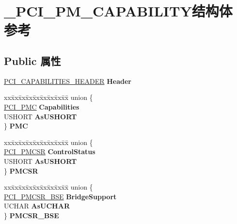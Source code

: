 \hypertarget{struct___p_c_i___p_m___c_a_p_a_b_i_l_i_t_y}{}\section{\+\_\+\+P\+C\+I\+\_\+\+P\+M\+\_\+\+C\+A\+P\+A\+B\+I\+L\+I\+T\+Y结构体 参考}
\label{struct___p_c_i___p_m___c_a_p_a_b_i_l_i_t_y}
\subsection*{Public 属性}
\begin{DoxyCompactItemize}
\item 
\mbox{\label{struct___p_c_i___p_m___c_a_p_a_b_i_l_i_t_y_a56d52777bab42a60927cb1ae72de0d36}} 
\hyperlink{struct___p_c_i___c_a_p_a_b_i_l_i_t_i_e_s___h_e_a_d_e_r}{P\+C\+I\+\_\+\+C\+A\+P\+A\+B\+I\+L\+I\+T\+I\+E\+S\+\_\+\+H\+E\+A\+D\+ER} {\bfseries Header}
\item 
\mbox{\label{struct___p_c_i___p_m___c_a_p_a_b_i_l_i_t_y_ad32e4e155e5213f632f8d986a36417ff}} 
\begin{tabbing}
xx\=xx\=xx\=xx\=xx\=xx\=xx\=xx\=xx\=\kill
union \{\\
\>\hyperlink{struct___p_c_i___p_m_c}{PCI\_PMC} {\bfseries Capabilities}\\
\>USHORT {\bfseries AsUSHORT}\\
\} {\bfseries PMC}\\

\end{tabbing}\item 
\mbox{\label{struct___p_c_i___p_m___c_a_p_a_b_i_l_i_t_y_a5f3b5cbfa6b27257e421b9f7964878ba}} 
\begin{tabbing}
xx\=xx\=xx\=xx\=xx\=xx\=xx\=xx\=xx\=\kill
union \{\\
\>\hyperlink{struct___p_c_i___p_m_c_s_r}{PCI\_PMCSR} {\bfseries ControlStatus}\\
\>USHORT {\bfseries AsUSHORT}\\
\} {\bfseries PMCSR}\\

\end{tabbing}\item 
\mbox{\label{struct___p_c_i___p_m___c_a_p_a_b_i_l_i_t_y_afb22978029b272593157f14c3ec71f93}} 
\begin{tabbing}
xx\=xx\=xx\=xx\=xx\=xx\=xx\=xx\=xx\=\kill
union \{\\
\>\hyperlink{struct___p_c_i___p_m_c_s_r___b_s_e}{PCI\_PMCSR\_BSE} {\bfseries BridgeSupport}\\
\>UCHAR {\bfseries AsUCHAR}\\
\} {\bfseries PMCSR\_BSE}\\


\end{tabbing}
\end{DoxyCompactItemize}
